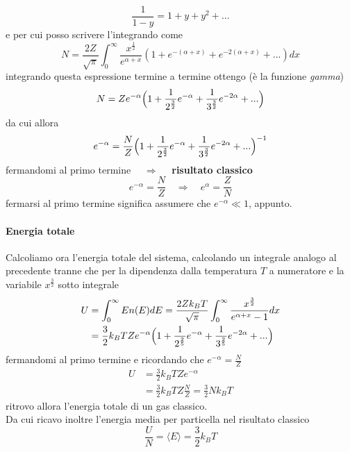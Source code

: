 $$ \frac{1}{1-y} = 1 + y + y^2 + ... $$
e per cui posso scrivere l'integrando come
\begin{equation}
N = \frac{2Z}{\sqrt{\pi}} \int_0^{\infty} \frac{x^{ \frac{1}{2} }}{e^{ \alpha + x }} (1 + e^{ - (\alpha + x) } + e^{ - 2 (\alpha + x) } + ... ) dx
\end{equation}
integrando questa espressione termine a termine ottengo (è la funzione \textit{gamma})
\begin{equation}
N = Z e^{ -\alpha } \Bigl(  1 + \frac{1}{2^{\frac{3}{2}}}e^{ -\alpha } + \frac{1}{3^{\frac{3}{2}}} e^{ -2\alpha } + ...  \Bigr)
\end{equation}
da cui allora 
\begin{equation}
e^{ -\alpha } = \frac{N}{Z} \Bigl(  1 + \frac{1}{2^{\frac{3}{2}}}e^{ -\alpha } + \frac{1}{3^{\frac{3}{2}}} e^{ -2\alpha } + ...  \Bigr)^{ -1 }
\end{equation}
fermandomi al primo termine $\quad\Rightarrow\quad $ \textbf{risultato classico}
\begin{equation}
e^{ -\alpha } = \frac{N}{Z} \quad\Rightarrow\quad e^{ \alpha } = \frac{Z}{N}
\end{equation}
fermarsi al primo termine significa assumere che $e^{ -\alpha } \ll 1$, appunto.


\paragraph{Energia totale} Calcoliamo ora l'energia totale del sistema, calcolando un integrale analogo al precedente tranne che per la dipendenza dalla temperatura $T$ a numeratore e la variabile $x^{ \frac{3}{2} }$ sotto integrale
\begin{equation}
\begin{split}
U & = \int_0^{\infty} E n(E)dE = \frac{2Zk_B T}{\sqrt{\pi}} \int_0^{\infty} \frac{x^{ \frac{3}{2} }}{e^{ \alpha + x } - 1 } dx \\
& = \frac{3}{2} k_B T Z e^{ -\alpha } \Bigl(  1 + \frac{1}{2^{ \frac{2}{5} }} e^{ -\alpha } +  \frac{1}{3^{ \frac{2}{5} }} e^{ -2 \alpha } + ... \Bigr)
\end{split}
\end{equation}
fermandomi al primo termine e ricordando che $e^{ -\alpha } = \frac{N}{Z}$
\begin{equation}
\begin{split}
U & = \frac{3}{2} k_B T Z e^{ -\alpha } \\
& = \frac{3}{2} k_B T Z \frac{N}{Z} = \frac{3}{2} N k_B T
\end{split}
\end{equation}
ritrovo allora l'energia totale di un gas classico. \\
Da cui ricavo inoltre l'energia media per particella nel risultato classico
\begin{equation}
\frac{U}{N} = \langle E \rangle = \frac{3}{2} k_B T
\end{equation}

